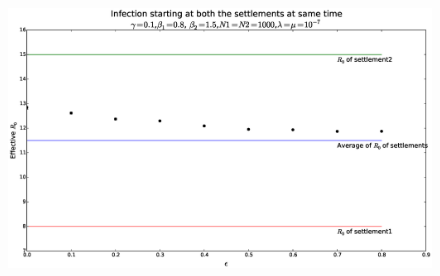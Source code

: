 \documentclass{article}
\begin{document}
\begin{figure}[H]
\hspace*{-2cm}
\includegraphics[scale=0.4]{Figures_Tables/sir_12inf.eps}
\end{figure}
\end{document}
